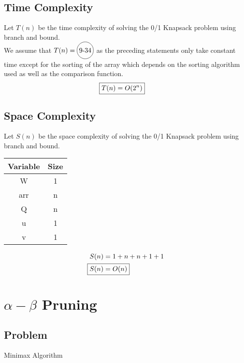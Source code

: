 \documentclass[12pt]{article}%
\newcommand*\circled[1]{\tikz[baseline=(char.base)]{
            \node[shape=circle,draw,inner sep=2pt] (char) {#1};}}
\begin{document}
  \subsection{Time Complexity}
    Let $T(n)$ be the time complexity of solving the 0/1 Knapsack problem using branch and bound. \\ 
    We assume that $T(n) =\circled{9-34}$ as the preceding statements only take constant time except for the sorting of the array which depends on the sorting algorithm used as well as the comparison function. \\ 

    \begin{align*}
      \Aboxed{T(n) = O(2^n)}
    \end{align*}
  \subsection{Space Complexity}
    Let $S(n)$ be the space complexity of solving the 0/1 Knapsack problem using branch and bound. 
    \begin{table}[H]
    \centering
    \begin{tabular}{|c|c|}
    \hline
    \textbf{Variable} & \textbf{Size} \\ \hline
    W                 & 1             \\ \hline
    arr               & n             \\ \hline
    Q                 & n             \\ \hline
    u                 & 1             \\ \hline
    v                 & 1             \\ \hline
    \end{tabular}
    \end{table}
    \begin{align*}
      S(n) &= 1 + n + n + 1 + 1 \\
      \Aboxed{S(n) &= O(n)} \\
    \end{align*}

\newpage

\section{$\alpha-\beta$ Pruning}
  \subsection{Problem}
    Minimax Algorithm
\end{document}
